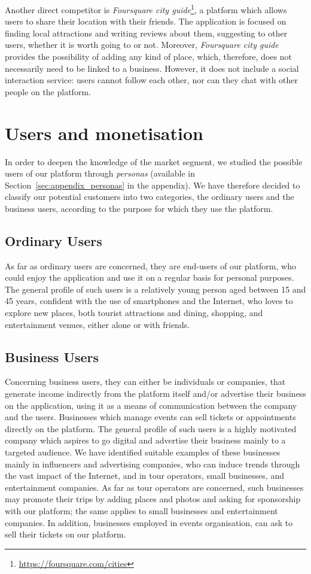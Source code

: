 \documentclass[letterpaper, 11pt]{Proposal}
\def\Sec#1{Section~\ref{#1}}
\begin{document}
Another direct competitor is \emph{Foursquare city guide}\footnote{\url{https://foursquare.com/cities}}, a platform which allows users to share their location with their friends. The application is focused on finding local attractions and writing reviews about them, suggesting to other users, whether it is worth going to or not. Moreover, \emph{Foursquare city guide} provides the possibility of adding any kind of place, which, therefore, does not necessarily need to be linked to a business. However, it does not include a social interaction service: users cannot follow each other, nor can they chat with other people on the platform.

\section{Users and monetisation}\label{sec:usrsAndMon}
In order to deepen the knowledge of the market segment, we studied the possible users of our platform through \emph{personas} (available in \Sec{sec:appendix_personas} in the appendix). We have therefore decided to classify our potential customers into two categories, the ordinary users and the business users, according to the purpose for which they use the platform.

\subsection{Ordinary Users}\label{subsec:usrsAndMon_users}
As far as ordinary users are concerned, they are end-users of our platform, who could enjoy the application and use it on a regular basis for personal purposes. The general profile of such users is a relatively young person aged between 15 and 45 years, confident with the use of smartphones and the Internet, who loves to explore new places, both tourist attractions and dining, shopping, and entertainment venues, either alone or with friends.

\subsection{Business Users}\label{subsec:usrsAndMon_business-users}
Concerning business users, they can either be individuals or companies, that generate income indirectly from the platform itself and/or advertise their business on the application, using it as a means of communication between the company and the users. Businesses which manage events can sell tickets or appointments directly on the platform. The general profile of such users is a highly motivated company which aspires to go digital and advertise their business mainly to a targeted audience. We have identified suitable examples of these businesses mainly in influencers and advertising companies, who can induce trends through the vast impact of the Internet, and in tour operators, small businesses, and entertainment companies.
As far as tour operators are concerned, such businesses may promote their trips by adding places and photos and asking for sponsorship with our platform; the same applies to small businesses and entertainment companies. In addition, businesses employed in events organisation, can ask to sell their tickets on our platform.
\end{document}
